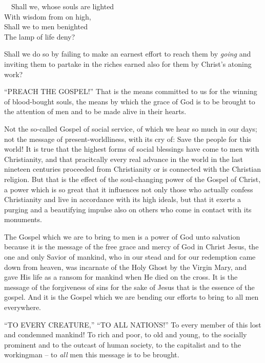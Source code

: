 \documentclass[
]{book}
\begin{document}
~~Shall we, whose souls are lighted\\
\hspace*{0.333em}\hspace*{0.333em}With wisdom from on high,\\
\hspace*{0.333em}\hspace*{0.333em}Shall we to men benighted\\
\hspace*{0.333em}\hspace*{0.333em}The lamp of life deny?

Shall we do so by failing to make an earnest effort to reach them by \emph{going} and inviting them to partake in the riches earned also for them by Christ's atoning work?

``PREACH THE GOSPEL!'' That is the means committed to us for the winning of blood-bought souls, the means by which the grace of God is to be brought to the attention of men and to be made alive in their hearts.

Not the so-called Gospel of social service, of which we hear so much in our days; not the message of present-worldliness, with its cry of: Save the people for this world! It is true that the highest forms of social blessings have come to men with Christianity, and that pracitcally every real advance in the world in the last nineteen centuries proceeded from Christianity or is connected with the Christian religion. But that is the effect of the soul-changing power of the Gospel of Christ, a power which is so great that it influences not only those who actually confess Christianity and live in accordance with its high ideals, but that it exerts a purging and a beautifying impulse also on others who come in contact with its monuments.

The Gospel which we are to bring to men is a power of God unto salvation because it is the message of the free grace and mercy of God in Christ Jesus, the one and only Savior of mankind, who in our stead and for our redemption came down from heaven, was incarnate of the Holy Ghost by the Virgin Mary, and gave His life as a ransom for mankind when He died on the cross. It is the message of the forgiveness of sins for the sake of Jesus that is the essence of the gospel. And it is the Gospel which we are bending our efforts to bring to all men everywhere.

``TO EVERY CREATURE,'' ``TO ALL NATIONS!'' To every member of this lost and condemned mankind! To rich and poor, to old and young, to the socially prominent and to the outcast of human society, to the capitalist and to the workingman -- to \emph{all} men this message is to be brought.
\end{document}
